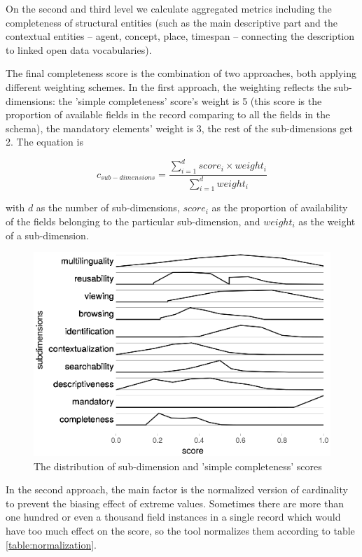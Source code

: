 On the second and third level we calculate aggregated metrics including the completeness of structural entities (such as the main descriptive part and the contextual entities – agent, concept, place, timespan – connecting the description to linked open data vocabularies).

The final completeness score is the combination of two approaches, both applying different weighting schemes. In the first approach, the weighting reflects the sub-dimensions: the 'simple completeness' score’s weight is 5 (this score is the proportion of available fields in the record comparing to all the fields in the schema), the mandatory elements’ weight is 3, the rest of the sub-dimensions get 2. The equation is

\begin{equation}
c_{sub-dimensions} = \frac{\sum\limits_{i=1}^{d} score_i \times weight_i}{\sum\limits_{i=1}^{d} weight_i}
\end{equation}

with $d$ as the number of sub-dimensions, $score_{i}$ as the proportion of availability of the fields belonging to the particular sub-dimension, and $weight_i$ as the weight of a sub-dimension.

\begin{figure}[ht]
\includegraphics[width=\textwidth]{images/chapter02/subdimensions.eps}
\centering
\caption{The distribution of sub-dimension and 'simple completeness' scores}
\label{fig:subdimensions}
\end{figure}

In the second approach, the main factor is the normalized version of cardinality to prevent the biasing effect of extreme values. Sometimes there are more than one hundred or even a thousand field instances in a single record which would have too much effect on the score, so the tool normalizes them according to table \ref{table:normalization}.

